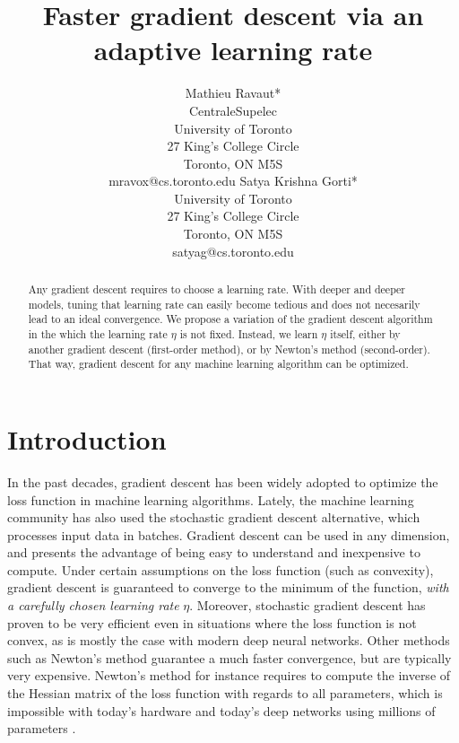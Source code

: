 \documentclass{article}
\title{Faster gradient descent via an adaptive learning rate}
\author{
	Mathieu Ravaut* \\ 
	CentraleSupelec\\
	University of Toronto \\
	27 King's College Circle\\
	Toronto, ON M5S\\
	mravox@cs.toronto.edu 
	\And
  	Satya Krishna Gorti*\\
	University of Toronto\\
	27 King's College Circle\\
	Toronto, ON M5S\\
	satyag@cs.toronto.edu	
}
\begin{document}
  
  
  \maketitle
  
  \begin{abstract}
    Any gradient descent requires to choose a learning rate. With deeper and deeper models, tuning that learning rate can easily become tedious and does not necesarily lead to an ideal convergence. We propose a variation of the gradient descent algorithm in the which the learning rate $\eta$ is not fixed. Instead, we learn $\eta$ itself, either by another gradient descent (first-order method), or by Newton's method (second-order). That way, gradient descent for any machine learning algorithm can be optimized. 
  \end{abstract}
  
  \thispagestyle{equalc}
  \section{Introduction}
  
  In the past decades, gradient descent has been widely adopted to optimize the loss function in machine learning algorithms. Lately, the machine learning community has also used the stochastic gradient descent alternative, which processes input data in batches. Gradient descent can be used in any dimension, and presents the advantage of being easy to understand and inexpensive to compute. Under certain assumptions on the loss function (such as convexity), gradient descent is guaranteed to converge to the minimum of the function, \emph{with a carefully chosen learning rate} $\eta$. Moreover, stochastic gradient descent has proven to be very efficient even in situations where the loss function is not convex, as is mostly the case with modern deep neural networks. Other methods such as Newton's method guarantee a much faster convergence, but are typically very expensive. Newton's method for instance requires to compute the inverse of the Hessian matrix of the loss function with regards to all parameters, which is impossible with today's hardware and today's deep networks using millions of parameters \cite{krizhevsky2012imagenet}. \\
  
\end{document}
